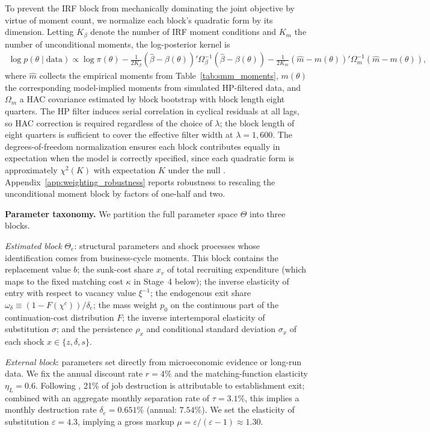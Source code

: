 \documentclass[authoryear, review, 12pt]{elsarticle}
\begin{document}
	To prevent the IRF block from mechanically dominating the joint objective by
	virtue of moment count, we normalize each block's quadratic form by its
	dimension. Letting $K_\beta$ denote the number of IRF moment conditions and
	$K_m$ the number of unconditional moments, the log-posterior kernel is
	\begin{align}\label{eq:posterior}
		\log p(\theta \mid \mathrm{data})
		\propto \log\pi(\theta)
		- \frac{1}{2K_\beta}(\hat\beta - \beta(\theta))'\Omega_\beta^{-1}
		(\hat\beta - \beta(\theta))
		- \frac{1}{2K_m}(\hat m - m(\theta))'\Omega_m^{-1}(\hat m - m(\theta)),
	\end{align}
	where $\hat m$ collects the empirical moments from Table~\ref{tab:smm_moments},
	$m(\theta)$ the corresponding model-implied moments from simulated HP-filtered
	data, and $\Omega_m$ a HAC covariance estimated by block bootstrap with block
	length eight quarters.  The HP filter induces serial correlation in cyclical
	residuals at all lags, so HAC correction is required regardless of the choice
	of $\lambda$; the block length of eight quarters is sufficient to cover the
	effective filter width at $\lambda=1{,}600$. The degrees-of-freedom normalization ensures each block
	contributes equally in expectation when the model is correctly specified, since
	each quadratic form is approximately $\chi^2(K)$ with expectation $K$ under the
	null \citep{dridi_2007}. Appendix~\ref{app:weighting_robustness} reports
	robustness to rescaling the unconditional moment block by factors of one-half and
	two.

	\medskip\noindent\textbf{Parameter taxonomy.}
	We partition the full parameter space $\Theta$ into three blocks.
	
	\emph{Estimated block} $\Theta_e$: structural parameters and shock processes
	whose identification comes from business-cycle moments. This block contains the
	replacement value $b$; the sunk-cost share $x_v$ of total recruiting expenditure
	(which maps to the fixed matching cost $\kappa$ in Stage~4 below); the inverse
	elasticity of entry with respect to vacancy value $\xi^{-1}$; the endogenous
	exit share $\omega_\delta \equiv (1-F(\chi^c))/\delta_e$; the mass weight $p_0$ on
	the continuous part of the continuation-cost distribution $F$; the inverse
	intertemporal elasticity of substitution $\sigma$; and the persistence
	$\rho_x$ and conditional standard deviation $\sigma_x$ of each shock
	$x\in\{z,\delta,s\}$.
	
	\emph{External block}: parameters set directly from microeconomic evidence or
	long-run data. We fix the annual discount rate $r=4\%$ and the matching-function
	elasticity $\eta_L=0.6$. Following \citet{jaimovich_2008}, 21\% of job
	destruction is attributable to establishment exit; combined with an aggregate
	monthly separation rate of $\tau=3.1\%$, this implies a monthly destruction
	rate $\delta_e=0.651\%$ (annual: $7.54\%$). We set the elasticity of
	substitution $\varepsilon=4.3$, implying a gross markup $\mu=\varepsilon/(\varepsilon-1)\approx1.30$.
	
\end{document}
